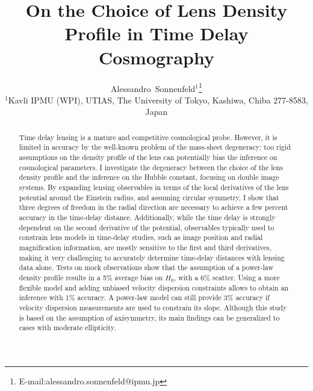 \documentclass[usenatbib]{mnras}
\begin{document}
\title{On the Choice of Lens Density Profile in Time Delay Cosmography}
\author[Sonnenfeld]{
Alessandro~Sonnenfeld$^{1}$\thanks{E-mail:alessandro.sonnenfeld@ipmu.jp}
\\
$^{1}$Kavli IPMU (WPI), UTIAS, The University of Tokyo, Kashiwa, Chiba 277-8583, Japan \\
}

\maketitle

\begin{abstract}
Time delay lensing is a mature and competitive cosmological probe.
However, it is limited in accuracy by the well-known problem of the mass-sheet degeneracy:
too rigid assumptions on the density profile of the lens can potentially bias the inference on cosmological parameters.
I investigate the degeneracy between the choice of the lens density profile and the inference on the Hubble constant, focusing on double image systems.
By expanding lensing observables in terms of the local derivatives of the lens potential around the Einstein radius, and assuming circular symmetry,
I show that three degrees of freedom in the radial direction are necessary to achieve a few percent accuracy in the time-delay distance.
Additionally, while the time delay is strongly dependent on the second derivative of the potential, observables typically used to constrain lens models in time-delay studies, such as image position and radial magnification information, are mostly sensitive to the first and third derivatives, making it very challenging to accurately determine time-delay distances with lensing data alone.
Tests on mock observations show that the assumption of a power-law density profile results in a 5\% average bias on $H_0$, with a 6\% scatter.
Using a more flexible model and adding unbiased velocity dispersion constraints allows to obtain an inference with 1\% accuracy.
A power-law model can still provide 3\% accuracy if velocity dispersion measurements are used to constrain its slope.
Although this study is based on the assumption of axisymmetry, its main findings can be generalized to cases with moderate ellipticity.
\end{abstract}
\end{document}
